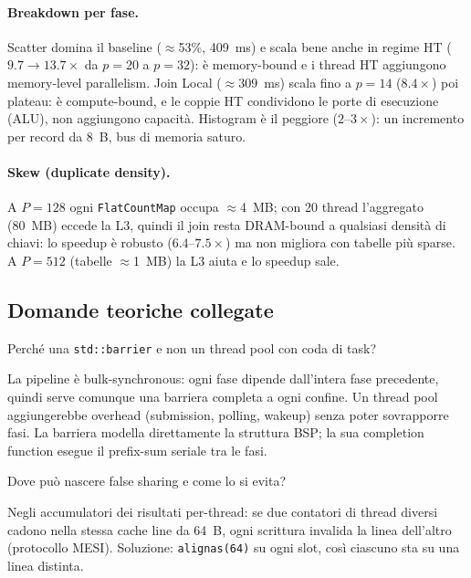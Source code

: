 \documentclass[11pt,a4paper]{article}
\theoremstyle{remark}
\newenvironment{esercizio}[1][]{%
  \begin{tcolorbox}[breakable,title={\textbf{Esercizio / Domanda d'esame}\ifx&#1&\else: #1\fi},
    colback=yellow!5!white, colframe=orange!75!black, fonttitle=\small\bfseries]%
}{%
  \end{tcolorbox}%
}
\newenvironment{risposta}{%
  \begin{tcolorbox}[breakable,title={\textbf{Risposta}},
    colback=green!5!white, colframe=green!50!black, fonttitle=\small\bfseries]%
}{%
  \end{tcolorbox}%
}
\begin{document}
\paragraph{Breakdown per fase.} Scatter domina il baseline ($\approx$53\%, 409~ms) e scala bene anche in regime HT ($9.7\to 13.7\times$ da $p=20$ a $p=32$): \`e memory-bound e i thread HT aggiungono memory-level parallelism. Join Local ($\approx$309~ms) scala fino a $p=14$ ($8.4\times$) poi plateau: \`e compute-bound, e le coppie HT condividono le porte di esecuzione (ALU), non aggiungono capacit\`a. Histogram \`e il peggiore ($2$--$3\times$): un incremento per record da 8~B, bus di memoria saturo.

\paragraph{Skew (duplicate density).} A $P=128$ ogni \texttt{FlatCountMap} occupa $\approx$4~MB; con 20 thread l'aggregato (80~MB) eccede la L3, quindi il join resta DRAM-bound a qualsiasi densit\`a di chiavi: lo speedup \`e robusto ($6.4$--$7.5\times$) ma non migliora con tabelle pi\`u sparse. A $P=512$ (tabelle $\approx$1~MB) la L3 aiuta e lo speedup sale.

\subsection{Domande teoriche collegate}

\begin{esercizio}[M2 -- Barriera vs thread pool]
Perch\'e una \texttt{std::barrier} e non un thread pool con coda di task?
\end{esercizio}
\begin{risposta}
La pipeline \`e bulk-synchronous: ogni fase dipende dall'intera fase precedente, quindi serve comunque una barriera completa a ogni confine. Un thread pool aggiungerebbe overhead (submission, polling, wakeup) senza poter sovrapporre fasi. La barriera modella direttamente la struttura BSP; la sua completion function esegue il prefix-sum seriale tra le fasi.
\end{risposta}

\begin{esercizio}[M2 -- False sharing]
Dove pu\`o nascere false sharing e come lo si evita?
\end{esercizio}
\begin{risposta}
Negli accumulatori dei risultati per-thread: se due contatori di thread diversi cadono nella stessa cache line da 64~B, ogni scrittura invalida la linea dell'altro (protocollo MESI). Soluzione: \texttt{alignas(64)} su ogni slot, cos\`i ciascuno sta su una linea distinta.
\end{risposta}
\end{document}

